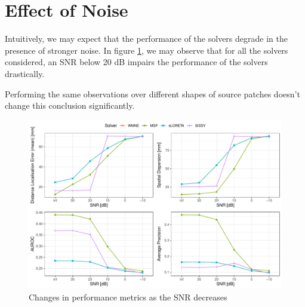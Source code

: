 \section{Effect of Noise}

Intuitively, we may expect that the performance of the solvers degrade in the presence of stronger noise.
%
In figure \ref{fig:noise_degradation}, we may observe that for all the solvers considered, an SNR below 20 dB impairs the performance of the solvers drastically.

Performing the same observations over different shapes of source patches doesn't change this conclusion significantly.

\begin{figure}
    \centering
    \includegraphics[width=0.95\linewidth]{img_stats/SNRdegradation_EvalMetrics_Protocol04_30.pdf}
    \caption{Changes in performance metrics as the SNR decreases}
    \label{fig:noise_degradation}
\end{figure}


%

%

